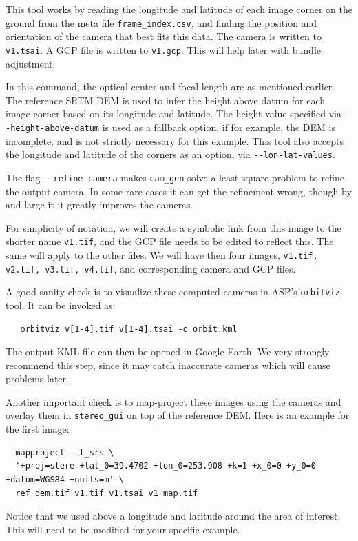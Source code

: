 This tool works by reading the longitude and latitude of each image corner on the ground 
from the meta file \texttt{frame\_index.csv}, and finding the position and orientation
of the camera that best fits this data. The camera is written to \texttt{v1.tsai}. 
A GCP file is written to \texttt{v1.gcp}. This will help later with bundle adjustment.

In this command, the optical center and focal length are as mentioned
earlier. The reference SRTM DEM is used to infer the height above datum
for each image corner based on its longitude and latitude. The height
value specified via \texttt{-\/-height-above-datum} is used as a
fallback option, if for example, the DEM is incomplete, and is not
strictly necessary for this example. This tool also accepts the
longitude and latitude of the corners as an option, via
\texttt{-\/-lon-lat-values}.

The flag \texttt{-\/-refine-camera} makes \texttt{cam\_gen} solve a least
square problem to refine the output camera. In some rare cases it can get the
refinement wrong, though by and large it it greatly improves the cameras.

For simplicity of notation, we will create a symbolic link from this image to
the shorter name \texttt{v1.tif}, and the GCP file needs to be edited to
reflect this. The same will apply to the other files. We will have then
four images, \texttt{v1.tif, v2.tif, v3.tif, v4.tif}, and corresponding
camera and GCP files.

A good sanity check is to visualize these computed cameras in ASP's
\texttt{orbitviz} tool. It can be invoked as:
\begin{verbatim}
   orbitviz v[1-4].tif v[1-4].tsai -o orbit.kml
\end{verbatim}

The output KML file can then be opened in Google Earth. We very strongly
recommend this step, since it may catch inaccurate cameras which will
cause problems later.

Another important check is to map-project these images using the cameras
and overlay them in \texttt{stereo\_gui} on top of the reference
DEM. Here is an example for the first image:
\begin{verbatim}
  mapproject --t_srs \
  '+proj=stere +lat_0=39.4702 +lon_0=253.908 +k=1 +x_0=0 +y_0=0 +datum=WGS84 +units=m' \
  ref_dem.tif v1.tif v1.tsai v1_map.tif 
\end{verbatim}

Notice that we used above a longitude and latitude around the area of interest. This 
will need to be modified for your specific example. 


